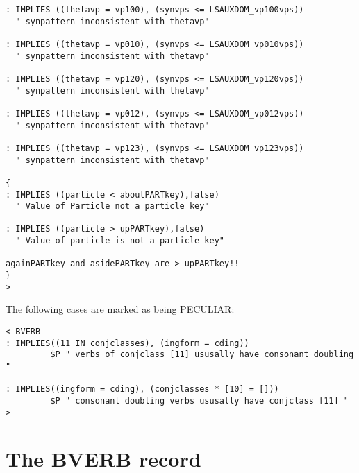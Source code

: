 \begin{verbatim}
: IMPLIES ((thetavp = vp100), (synvps <= LSAUXDOM_vp100vps))
  " synpattern inconsistent with thetavp" 

: IMPLIES ((thetavp = vp010), (synvps <= LSAUXDOM_vp010vps))
  " synpattern inconsistent with thetavp" 

: IMPLIES ((thetavp = vp120), (synvps <= LSAUXDOM_vp120vps))
  " synpattern inconsistent with thetavp" 

: IMPLIES ((thetavp = vp012), (synvps <= LSAUXDOM_vp012vps))
  " synpattern inconsistent with thetavp" 

: IMPLIES ((thetavp = vp123), (synvps <= LSAUXDOM_vp123vps))
  " synpattern inconsistent with thetavp" 

{
: IMPLIES ((particle < aboutPARTkey),false)
  " Value of Particle not a particle key"

: IMPLIES ((particle > upPARTkey),false)
  " Value of particle is not a particle key"

againPARTkey and asidePARTkey are > upPARTkey!!
}
>
\end{verbatim}
\vspace{3 ex}
The following cases are marked as being PECULIAR:

\begin{verbatim}
< BVERB
: IMPLIES((11 IN conjclasses), (ingform = cding))
         $P " verbs of conjclass [11] ususally have consonant doubling "

: IMPLIES((ingform = cding), (conjclasses * [10] = []))
         $P " consonant doubling verbs ususally have conjclass [11] "
>
\end{verbatim}

\appendix

\newpage
\section{The BVERB record}


